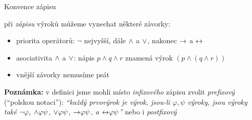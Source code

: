 \documentclass{beamer}
\begin{document}
\begin{frame}{Konvence zápisu}
    
    při \emph{zápisu} výroků můžeme vynechat některé závorky:


    \begin{itemize}
        \item priorita operátorů: $\neg$ nejvyšší, dále ${\land}$ a ${\lor}$, nakonec ${\mathbin{\rightarrow}}$ a ${\mathbin{\leftrightarrow}}$
        \item asociativita ${\land}$ a ${\lor}$: nápis $p\land q\land r$ znamená výrok $(p\land (q\land r))$
        \item vnější závorky nemusíme psát
    \end{itemize}

    \textbf{Poznámka:} v definici jsme mohli místo \emph{infixového} zápisu zvolit \emph{prefixový} (``polskou notaci''):
    {\it ``každý prvovýrok je výrok, jsou-li $\varphi,\psi$ výroky, jsou výroky také $\neg \varphi$, ${\land} \varphi \psi$, ${\lor} \varphi \psi$, ${\mathbin{\rightarrow}} \varphi \psi$, a ${\mathbin{\leftrightarrow}} \varphi \psi$''} nebo i \emph{postfixový}
    

    \medskip

\end{frame}
\end{document}
